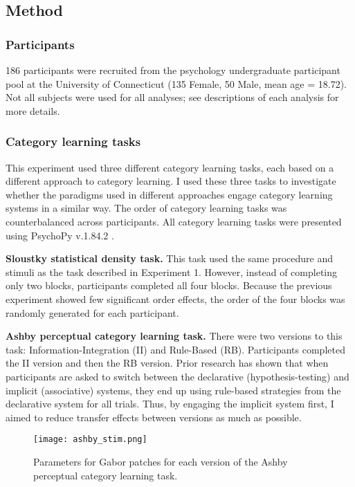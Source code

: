 \documentclass[../dissertation.tex]{subfiles}
\begin{document}
\subsection{Method}
\subsubsection{Participants}
186 participants were recruited from the psychology undergraduate participant pool at the University of Connecticut (135 Female, 50 Male, mean age = 18.72). Not all subjects were used for all analyses; see descriptions of each analysis for more details.
\subsubsection{Category learning tasks}
This experiment used three different category learning tasks, each based on a different approach to category learning. I used these three tasks to investigate whether the paradigms used in different approaches engage category learning systems in a similar way. The order of category learning tasks was counterbalanced across participants. All category learning tasks were presented using PsychoPy v.1.84.2 \citep{Peirce2007}. \par 
\textbf{Sloustky statistical density task.} This task used the same procedure and stimuli as the task described in Experiment 1. However, instead of completing only two blocks, participants completed all four blocks. Because the previous experiment showed few significant order effects, the order of the four blocks was randomly generated for each participant. \par
\textbf{Ashby perceptual category learning task.} There were two versions to this task: Information-Integration (II) and Rule-Based (RB). Participants completed the II version and then the RB version. Prior research has shown that when participants are asked to switch between the declarative (hypothesis-testing) and implicit (associative) systems, they end up using rule-based strategies from the declarative system for all trials. Thus, by engaging the implicit system first, I aimed to reduce transfer effects between versions as much as possible. \par

\begin{wrapfigure}{L}{0.625\textwidth}
\vspace{-10pt}
\texttt{[image: ashby\_stim.png]}
\caption[Stimulus parameters for Ashby perceptual category learning task]{Parameters for Gabor patches for each version of the Ashby perceptual category learning task. }
\label{ashby_param}
\vspace{-20pt}
\end{wrapfigure}	
\end{document}
